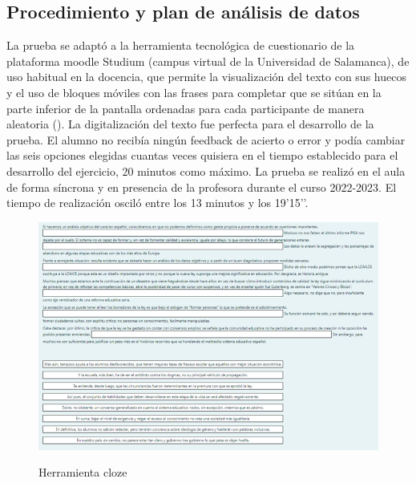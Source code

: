\documentclass[spanish]{textolivre}
\begin{document}
\subsection{Procedimiento y plan de análisis de datos}

La prueba se adaptó a la herramienta tecnológica de cuestionario de la plataforma moodle Studium (campus virtual de la Universidad de Salamanca), de uso habitual en la docencia, que permite la visualización del texto con sus huecos y el uso de bloques móviles con las frases para completar que se sitúan en la parte inferior de la pantalla ordenadas para cada participante de manera aleatoria (). La digitalización del texto fue perfecta para el desarrollo de la prueba. El alumno no recibía ningún feedback de acierto o error y podía cambiar las seis opciones elegidas cuantas veces quisiera en el tiempo establecido para el desarrollo del ejercicio, 20 minutos como máximo. La prueba se realizó en el aula de forma síncrona y en presencia de la profesora durante el curso 2022-2023. El tiempo de realización osciló entre los 13 minutos y los 19’15’’.

\begin{figure}[h!]
\centering
\begin{minipage}{1\textwidth}
 \includegraphics[width=\textwidth]{Fig3.png}
 \caption{Herramienta cloze}
 \label{fig3}
\end{minipage}
\end{figure}
\end{document}
